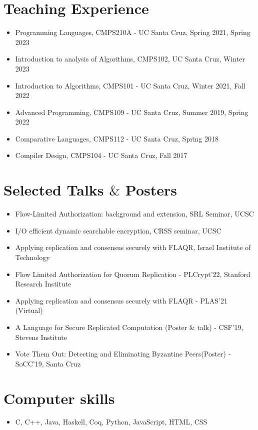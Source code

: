 \documentclass[9pt,a4paper]{moderncv}
\begin{document}
\section{Teaching Experience}
\begin{itemize}
\item Programming Languages, CMPS210A - UC Santa Cruz, Spring 2021, Spring 2023 
\item Introduction to analysis of Algorithms, CMPS102, UC Santa Cruz, Winter 2023
\item Introduction to Algorithms, CMPS101 - UC Santa Cruz, Winter 2021, Fall 2022
\item Advanced Programming, CMPS109 - UC Santa Cruz, Summer 2019, Spring 2022
\item Comparative Languages, CMPS112 - UC Santa Cruz, Spring 2018
\item Compiler Design, CMPS104 - UC Santa Cruz, Fall 2017
\end{itemize}
\section{Selected Talks $\&$ Posters}
\begin{itemize}
\item Flow-Limited Authorization: background and extension, SRL Seminar, UCSC
\item I/O efficient dynamic searchable encryption, CRSS seminar, UCSC
\item Applying replication and consensus securely with FLAQR, Israel Institute of Technology
\item Flow Limited Authorization for Quorum Replication - PLCrypt'22, Stanford Research Institute
\item Applying replication and consensus securely with FLAQR - PLAS'21 (Virtual)%
\item A Language for Secure Replicated Computation (Poster \& talk) - CSF'19, Stevens Institute
\item Vote Them Out: Detecting and Eliminating Byzantine Peers(Poster) - SoCC'19, Santa Cruz 
\end{itemize}
\section{Computer skills}
\begin{itemize}
\item C, C++, Java, Haskell, Coq, Python, JavaScript, HTML, CSS
\end{itemize}
\end{document}
